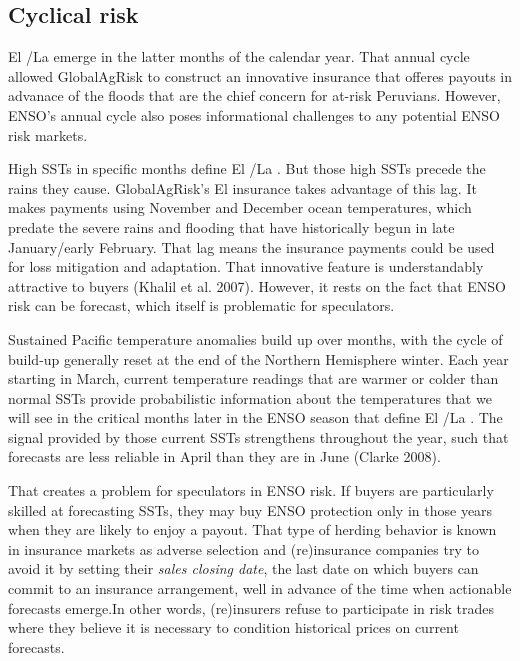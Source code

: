 \documentclass[article]{jss}
\begin{document}
\subsection{Cyclical risk}\label{cyclical-risk}

El /La  emerge in the latter months of the
calendar year. That annual cycle allowed GlobalAgRisk to construct an
innovative insurance that offeres payouts in advanace of the floods that
are the chief concern for at-risk Peruvians. However, ENSO's annual
cycle also poses informational challenges to any potential ENSO risk
markets.

High SSTs in specific months define El /La .
But those high SSTs precede the rains they cause. GlobalAgRisk's El
 insurance takes advantage of this lag. It makes payments
using November and December ocean temperatures, which predate the severe
rains and flooding that have historically begun in late January/early
February. That lag means the insurance payments could be used for loss
mitigation and adaptation. That innovative feature is understandably
attractive to buyers (Khalil et al. 2007). However, it rests on the fact
that ENSO risk can be forecast, which itself is problematic for
speculators.

Sustained Pacific temperature anomalies build up over months, with the
cycle of build-up generally reset at the end of the Northern Hemisphere
winter. Each year starting in March, current temperature readings that
are warmer or colder than normal SSTs provide probabilistic information
about the temperatures that we will see in the critical months later in
the ENSO season that define El /La . The
signal provided by those current SSTs strengthens throughout the year,
such that forecasts are less reliable in April than they are in June
(Clarke 2008).

That creates a problem for speculators in ENSO risk. If buyers are
particularly skilled at forecasting SSTs, they may buy ENSO protection
only in those years when they are likely to enjoy a payout. That type of
herding behavior is known in insurance markets as adverse selection and
(re)insurance companies try to avoid it by setting their \emph{sales
closing date}, the last date on which buyers can commit to an insurance
arrangement, well in advance of the time when actionable forecasts
emerge.In other words, (re)insurers refuse to participate in risk trades
where they believe it is necessary to condition historical prices on
current forecasts.
\end{document}
